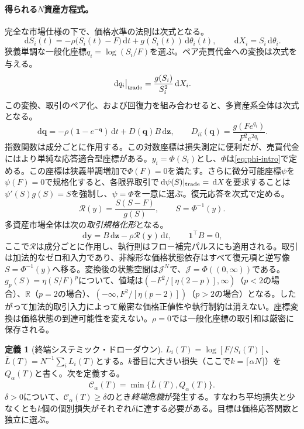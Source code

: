 \documentclass[11pt]{article}
\numberwithin{equation}{section}
\theoremstyle{definition}
\newtheorem{definition}[theorem]{定義}
\theoremstyle{remark}
\newcommand{\Cris}{\mathcal{C}}
\newcommand{\dd}{\,\mathrm{d}}
\newcommand{\one}{\mathbf{1}}
\begin{document}
\paragraph{得られる$N$資産方程式。} 完全な市場仕様の下で、価格水準の法則は次式となる。
\begin{equation}\label{eq:level-dynamics}
\boxed{\dd S_i(t)=-\rho\big(S_i(t)-F\big)\dd t+g(S_i(t))\dd\theta_i(t),\qquad \dd X_i=S_i\dd\theta_i.}
\end{equation}
狭義単調な一般化座標$q_i=\log(S_i/F)$を選ぶ。ペア売買代金への変換は次式を与える。
\begin{equation}\label{eq:log-impact}
\dd q_i\big|_{\rm trade}=\frac{g(S_i)}{S_i^2}\dd X_i.
\end{equation}
この変換、取引のペア化、および回復力を組み合わせると、多資産系全体は次式となる。
\begin{equation}\label{eq:master}
\boxed{\dd\bm q=-\rho(\one-e^{-\bm q})\dd t+D(\bm q)B\dd\bm z,\qquad
D_{ii}(\bm q)=\frac{g(Fe^{q_i})}{F^2e^{2q_i}}.}
\end{equation}
指数関数は成分ごとに作用する。この対数座標は損失測定に便利だが、売買代金にはより単純な応答適合型座標がある。$y_i=\Phi(S_i)$とし、$\Phi$は\eqref{eq:phi-intro}で定める。この座標は狭義単調増加で$\Phi(F)=0$を満たす。さらに微分可能座標$\psi$を$\psi(F)=0$で規格化すると、各限界取引で$\dd\psi(S)|_{\rm trade}=\dd X$を要求することは$\psi'(S)g(S)=S$を強制し、$\psi=\Phi$を一意に選ぶ。復元応答を次式で定める。
\[
\mathcal R(y)=\frac{S(S-F)}{g(S)},\qquad S=\Phi^{-1}(y).
\]
多資産市場全体は次の\emph{取引規格化形}となる。
\begin{equation}\label{eq:normal-form}
\boxed{\dd\bm y=B\dd\bm z-\rho\mathcal R(\bm y)\dd t,\qquad\one^\top B=0,}
\end{equation}
ここで$\mathcal R$は成分ごとに作用し、執行則はフロー補完パルスにも適用される。取引は加法的なゼロ和入力であり、非線形な価格状態依存はすべて復元項と逆写像$S=\Phi^{-1}(y)$へ移る。変換後の状態空間は$\mathcal J^N$で、$\mathcal J=\Phi((0,\infty))$である。$g_p(S)=\eta(S/F)^p$について、値域は$(-F^2/[\eta(2-p)],\infty)$（$p<2$の場合）、$\mathbb R$（$p=2$の場合）、$(-\infty,F^2/[\eta(p-2)])$（$p>2$の場合）となる。したがって加法的取引入力によって厳密な価格正値性や執行制約は消えない。座標変換は価格状態の到達可能性を変えない。$\rho=0$では一般化座標の取引和は厳密に保存される。

\begin{definition}[終端システミック・ドローダウン]\label{def:crash}
$L_i(T)=\log[F/S_i(T)]$、$\overline L(T)=N^{-1}\sum_i L_i(T)$とする。$k$番目に大きい損失（ここで$k=\lceil\alpha N\rceil$）を$Q_\alpha(T)$と書く。次を定義する。
\begin{equation}\label{eq:crash}
\boxed{\Cris_\alpha(T)=\min\{\overline L(T),Q_\alpha(T)\}.}
\end{equation}
$\delta>0$について、$\Cris_\alpha(T)\ge\delta$のとき\emph{終端危機}が発生する。すなわち平均損失と少なくとも$k$個の個別損失がそれぞれ$\delta$に達する必要がある。目標は価格応答関数と独立に選ぶ。
\end{definition}
\end{document}
